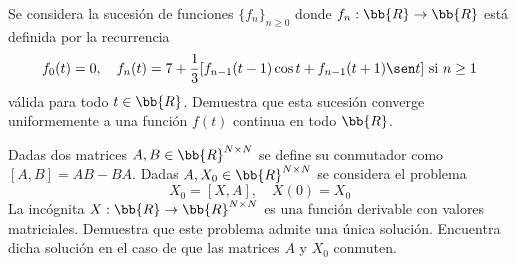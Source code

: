 \documentclass[12pt]{article}
\begin{document}
    \begin{ejercicio}
        Se considera la sucesión de funciones $\{f_n\}_{n\geq 0}$ donde $f_n : \bb{R} \to \bb{R}$ está definida por la recurrencia
        \[
            f_0(t) = 0, \quad f_n(t) = 7 + \frac{1}{3}[f_{n-1}(t-1)\cos t + f_{n-1}(t+1)\sen t] \text{ si } n \geq 1
        \]
        válida para todo $t \in \bb{R}$. Demuestra que esta sucesión converge uniformemente a una función $f(t)$ continua en todo $\bb{R}$.
    \end{ejercicio}

    \begin{ejercicio}
        Dadas dos matrices $A, B \in \bb{R}^{N\times N}$ se define su conmutador como $[A, B] = AB - BA$. Dadas $A, X_0 \in \bb{R}^{N\times N}$ se considera el problema
        \[
            X_0 = [X, A], \quad X(0) = X_0
        \]
        La incógnita $X : \bb{R} \to \bb{R}^{N\times N}$ es una función derivable con valores matriciales. Demuestra que este problema admite una única solución. Encuentra dicha solución en el caso de que las matrices $A$ y $X_0$ conmuten.
    \end{ejercicio}
\end{document}
